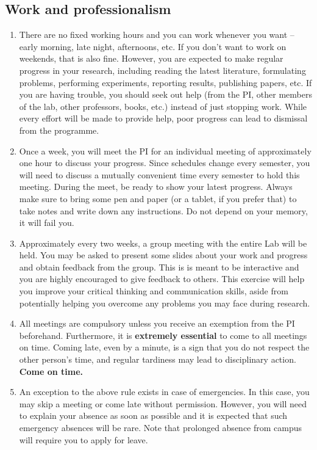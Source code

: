 \documentclass[12pt]{article}
\begin{document}
\subsection{Work and professionalism}
\begin{enumerate}
	\item There are no fixed working hours and you can work whenever you want -- early morning, late night, afternoons, etc. If you don't want to work on weekends, that is also fine. However, you are expected to make regular progress in your research, including reading the latest literature, formulating problems, performing experiments, reporting results, publishing papers, etc. If you are having trouble, you should seek out help (from the PI, other members of the lab, other professors, books, etc.) instead of just stopping work. While every effort will be made to provide help, poor progress can lead to dismissal from the programme. 
	\item Once a week, you will meet the PI for an individual meeting of approximately one hour to discuss your progress. Since schedules change every semester, you will need to discuss a mutually convenient time every semester to hold this meeting. During the meet, be ready to show your latest progress. Always make sure to bring some pen and paper (or a tablet, if you prefer that) to take notes and write down any instructions. Do not depend on your memory, it will fail you.
	\item Approximately every two weeks, a group meeting with the entire Lab will be held. You may be asked to present some slides about your work and progress and obtain feedback from the group. This is is meant to be interactive and you are highly encouraged to give feedback to others. This exercise will help you improve your critical thinking and communication skills, aside from potentially helping you overcome any problems you may face during research.
	\item All meetings are compulsory unless you receive an exemption from the PI beforehand. Furthermore, it is \textbf{extremely essential} to come to all meetings on time. Coming late, even by a minute, is a sign that you do not respect the other person's time, and regular tardiness may lead to disciplinary action. \textbf{Come on time.}
	\item An exception to the above rule exists in case of emergencies. In this case, you may skip a meeting or come late without permission. However, you will need to explain your absence as soon as possible and it is expected that such emergency absences will be rare. Note that prolonged absence from campus will require you to apply for leave.

\end{enumerate}
\end{document}
